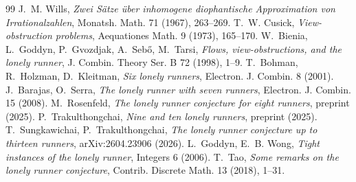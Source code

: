 \documentclass[11pt]{article}
\theoremstyle{definition}
\begin{document}
\begin{thebibliography}{99}
 J.~M. Wills, \emph{Zwei S\"atze \"uber inhomogene diophantische
Approximation von Irrationalzahlen}, Monatsh. Math. 71 (1967), 263--269.
 T.~W. Cusick, \emph{View-obstruction problems}, Aequationes Math. 9
(1973), 165--170.
 W.~Bienia, L.~Goddyn, P.~Gvozdjak, A.~Seb\H{o}, M.~Tarsi, \emph{Flows,
view-obstructions, and the lonely runner}, J. Combin. Theory Ser. B 72 (1998), 1--9.
 T.~Bohman, R.~Holzman, D.~Kleitman, \emph{Six lonely runners}, Electron. J.
Combin. 8 (2001).
 J.~Barajas, O.~Serra, \emph{The lonely runner with seven runners},
Electron. J. Combin. 15 (2008).
 M.~Rosenfeld, \emph{The lonely runner conjecture for eight runners},
preprint (2025).
 P.~Trakulthongchai, \emph{Nine and ten lonely runners}, preprint (2025).
 T.~Sungkawichai, P.~Trakulthongchai, \emph{The lonely runner conjecture
up to thirteen runners}, arXiv:2604.23906 (2026).
 L.~Goddyn, E.~B. Wong, \emph{Tight instances of the lonely runner},
Integers 6 (2006).
 T.~Tao, \emph{Some remarks on the lonely runner conjecture}, Contrib.
Discrete Math. 13 (2018), 1--31.
\end{thebibliography}
\end{document}
